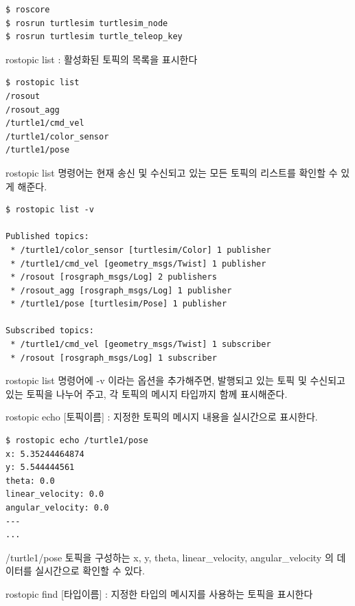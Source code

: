 \begin{lstlisting}[language=ROS]
$ roscore
$ rosrun turtlesim turtlesim_node 
$ rosrun turtlesim turtle_teleop_key
\end{lstlisting}

\setcounter{num}{0}

\noindent
{}\circled{\thenum} rostopic list : 활성화된 토픽의 목록을 표시한다

\begin{lstlisting}[language=ROS]
$ rostopic list
/rosout
/rosout_agg
/turtle1/cmd_vel
/turtle1/color_sensor
/turtle1/pose
\end{lstlisting}

\noindent
rostopic list 명령어는 현재 송신 및 수신되고 있는 모든 토픽의 리스트를 확인할 수 있게 해준다.

\begin{lstlisting}[language=ROS]
$ rostopic list -v

Published topics:
 * /turtle1/color_sensor [turtlesim/Color] 1 publisher
 * /turtle1/cmd_vel [geometry_msgs/Twist] 1 publisher
 * /rosout [rosgraph_msgs/Log] 2 publishers
 * /rosout_agg [rosgraph_msgs/Log] 1 publisher
 * /turtle1/pose [turtlesim/Pose] 1 publisher

Subscribed topics:
 * /turtle1/cmd_vel [geometry_msgs/Twist] 1 subscriber
 * /rosout [rosgraph_msgs/Log] 1 subscriber
\end{lstlisting}

\noindent
rostopic list 명령어에 -v 이라는 옵션을 추가해주면, 발행되고 있는 토픽 및 수신되고 있는 토픽을 나누어 주고, 각 토픽의 메시지 타입까지 함께 표시해준다.

\vspace{\baselineskip}
\noindent
{}\circled{\thenum} rostopic echo [토픽이름] : 지정한 토픽의 메시지 내용을 실시간으로 표시한다.

\begin{lstlisting}[language=ROS]
$ rostopic echo /turtle1/pose 
x: 5.35244464874
y: 5.544444561
theta: 0.0
linear_velocity: 0.0
angular_velocity: 0.0
---
...
\end{lstlisting}

\noindent
/turtle1/pose 토픽을 구성하는 x, y, theta, linear\_velocity, angular\_velocity 의 데이터를 실시간으로 확인할 수 있다.

\vspace{\baselineskip}
\noindent
{}\circled{\thenum} rostopic find [타입이름] : 지정한 타입의 메시지를 사용하는 토픽을 표시한다

